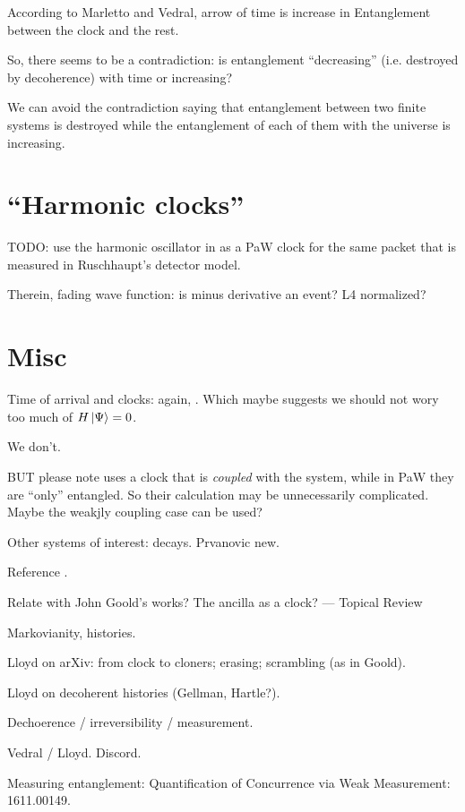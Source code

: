 According to Marletto and Vedral, arrow of time is increase in Entanglement
between the clock and the rest.

So, there seems to be a contradiction: is entanglement ``decreasing''
(i.e. destroyed by decoherence) with time
or increasing?

We can avoid the contradiction saying that
entanglement between two finite systems is
destroyed while the entanglement of each of them with the universe
is increasing.




\section{``Harmonic clocks''}

TODO: use the harmonic oscillator in \cite{HarmonicClocks}
as a PaW clock for the same packet that is measured in
Ruschhaupt's detector model.

Therein, fading wave function: is minus derivative an event?
L4 normalized?


\section{Misc}

Time of arrival and clocks: again, \cite{YearsleyHalliwell_Clocks}.
Which maybe suggests we should not wory too much of $H\ket{\Psi} = 0$. 

We don't. 

BUT please note \cite{YearsleyHalliwell_Clocks} uses a clock that is
\emph{coupled} with the system, while in PaW they are ``only'' entangled.
So their calculation may be unnecessarily complicated.
Maybe the weakjly coupling case can be used?

Other systems of interest: decays. Prvanovic new.

Reference \cite{ConnesRovelliThermo}.

Relate with John Goold's works? The ancilla as a clock? --- Topical Review

Markovianity, histories.

Lloyd on arXiv: from clock to cloners; erasing; scrambling (as in Goold).

Lloyd on decoherent histories (Gellman, Hartle?).

Dechoerence / irreversibility / measurement.

Vedral / Lloyd. Discord.

Measuring entanglement: Quantification of Concurrence via Weak Measurement: 1611.00149.

